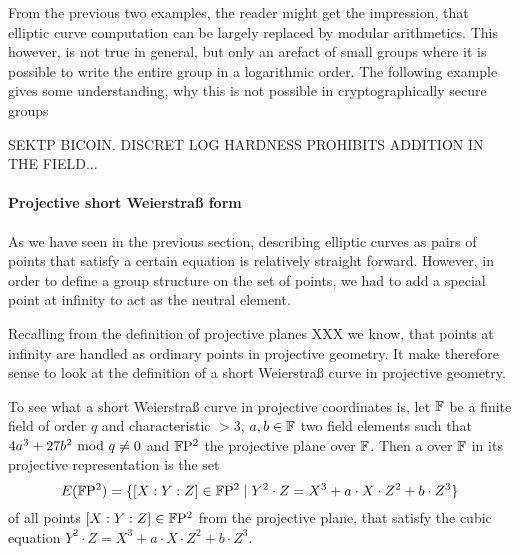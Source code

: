 From the previous two examples, the reader might get the impression, that elliptic curve computation can be largely replaced by modular arithmetics. This however, is not true in general, but only an arefact of small groups where it is possible to write the entire group in a logarithmic order. The following example gives some understanding, why this is not possible in cryptographically secure groups
\begin{example}
SEKTP BICOIN. DISCRET LOG HARDNESS PROHIBITS ADDITION IN THE FIELD...
\end{example}
\paragraph{Projective short Weierstraß form}
As we have seen in the previous section, describing elliptic curves as pairs of points that satisfy a certain equation is relatively straight forward. However, in order to define a group structure on the set of points, we had to add a special point at infinity to act as the neutral element. 

Recalling from the definition of projective planes XXX we know, that points at infinity are handled as ordinary points in projective geometry. It make therefore sense to look at the definition of a short Weierstraß curve in projective geometry.

To see what a short Weierstraß curve in projective coordinates is, let $\mathbb{F}$ be a finite field of order $q$ and characteristic $>3$, $a,b\in \mathbb{F}$ two field elements such that $4a^3+ 27b^2 \text{ mod } q\neq 0$ and $\mathbb{F}\mathrm{P}^2$ the projective plane over $\mathbb{F}$. Then a  over $\mathbb{F}$ in its projective representation is the set
\begin{equation}
\label{def_short_weierstrass_curve}
E(\mathbb{F}\mathrm{P}^2) = \{[X:Y:Z]\in \mathbb{F}\mathrm{P}^2\;|\; Y^2\cdot Z = X^3+a\cdot X\cdot Z^2 + b\cdot Z^3 \}
\end{equation}
of all points $[X:Y:Z]\in \mathbb{F}\mathrm{P}^2$ from the projective plane, that satisfy the  cubic equation $Y^2\cdot Z = X^3+a\cdot X\cdot Z^2 + b\cdot Z^3$.

